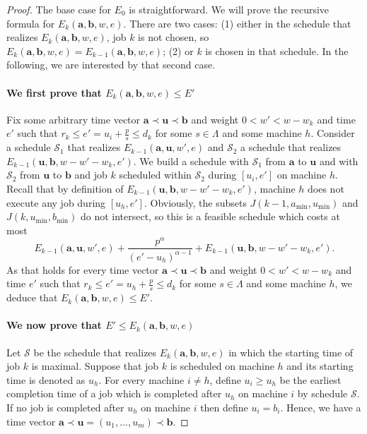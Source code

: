 \documentclass[11pt,a4paper]{article}
\newcommand{\vecteur}[1]{\ensuremath{\mathbf{#1}}}
\begin{document}
\begin{proof}
The base case for $E_{0}$ is straightforward. We will prove the recursive formula 
for $E_k(\vecteur{a},\vecteur{b},w,e)$. There are two cases: (1) either in the schedule
that realizes $E_k(\vecteur{a},\vecteur{b},w,e)$, job $k$ is not chosen, so 
$E_k(\vecteur{a},\vecteur{b},w,e) = E_{k-1}(\vecteur{a},\vecteur{b},w,e)$; 
(2) or $k$ is chosen in that schedule. In the following, we are interested 
by that second case.

\paragraph{We first prove that $E_k(\vecteur{a},\vecteur{b},w,e)\le E'$}
Fix some arbitrary time vector $\vecteur{a} \prec \vecteur{u} \prec \vecteur{b}$
and weight $0 < w' < w - w_{k}$ and time $e'$ such that $r_{k} \leq e' = u_{i} + \frac{p}{s} \le d_k$
for some $s \in \Lambda$ and some machine $h$. 
Consider a schedule $\mathcal{S}_1$ 
that realizes $E_{k-1}(\vecteur{a},\vecteur{u},w',e)$ and $\mathcal{S}_2$ 
a schedule that realizes $E_{k-1}(\vecteur{u}, \vecteur{b},w - w' - w_k, e')$.
We build a schedule with $\mathcal{S}_1$ from $\vecteur{a}$ to $\vecteur{u}$ and with 
$\mathcal{S}_2$ from $\vecteur{u}$ to $\vecteur{b}$ and job $k$ scheduled within $\mathcal{S}_2$
during $[u_{i},e']$ on machine $h$. 
Recall that by definition of $E_{k-1}(\vecteur{u}, \vecteur{b},w - w' - w_k, e')$, 
machine $h$ does not execute any job during $[u_{h},e']$.
Obviously, the subsets $J(k-1,a_{\min},u_{\min})$ and $J(k,u_{\min},b_{\min})$ do not intersect, so
this is a feasible schedule which costs at most 
$$E_{k-1}(\vecteur{a},\vecteur{u},w',e)  +
				\frac{p^\alpha}{(e'-u_{h})^{\alpha-1}}
 			+E_{k-1}(\vecteur{u},\vecteur{b},w-w'-w_k,e').
$$
As that holds for every time vector $\vecteur{a} \prec \vecteur{u} \prec \vecteur{b}$
and weight $0 < w' < w - w_{k}$ and time $e'$ such that $r_{k} \leq e' = u_{h} + \frac{p}{s} \le d_k$
for some $s \in \Lambda$ and some machine $h$, we deduce that 
$E_k(\vecteur{a},\vecteur{b},w,e) \le E'$.



\paragraph{We now prove that $E'\le E_k(\vecteur{a},\vecteur{b},w,e)$}
Let $\mathcal{S}$ be the schedule that realizes $E_k(\vecteur{a},\vecteur{b},w,e)$ in which
the starting time of job $k$ is maximal. Suppose that job $k$ is scheduled on machine $h$ and 
its starting time is denoted as $u_h$. For every machine $i \neq h$, define $u_{i} \geq u_{h}$ be the earliest 
completion time of a job which is completed after $u_{h}$ on machine $i$ by schedule $\mathcal{S}$. 
If no job is completed after $u_{h}$ on machine $i$ then define $u_{i} = b_{i}$. Hence, we have a time vector 
$\vecteur{a} \prec \vecteur{u} = (u_{1},\ldots, u_{m}) \prec \vecteur{b}$.


\end{proof}
\end{document}
